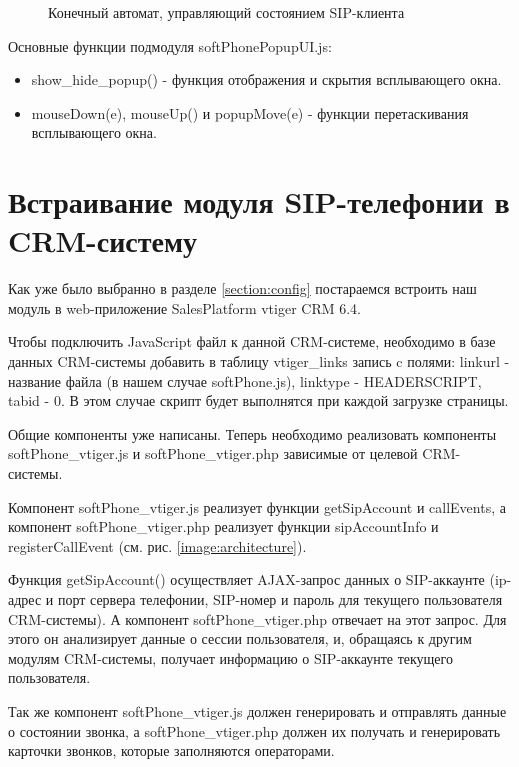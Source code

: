 \begin{figure}[h!]
\caption{Конечный автомат, управляющий состоянием SIP-клиента}
\label{image:FinalState}
\end{figure}

Основные функции подмодуля softPhonePopupUI.js:
\begin{itemize}
\item show\_hide\_popup() - функция отображения и скрытия всплывающего окна.
\item mouseDown(e), mouseUp() и popupMove(e) - функции перетаскивания всплывающего окна.
\end{itemize}

\section{Встраивание модуля SIP-телефонии в CRM-систему}

Как уже было выбранно в разделе \ref{section:config} постараемся встроить наш модуль в web-приложение SalesPlatform vtiger CRM 6.4.

Чтобы подключить JavaScript файл к данной CRM-системе, необходимо в базе данных CRM-системы добавить в таблицу vtiger\_links запись c полями: linkurl - название файла (в нашем случае softPhone.js), linktype - HEADERSCRIPT, tabid - 0.\cite{vtiger_db} В этом случае скрипт будет выполнятся при каждой загрузке страницы.

Общие компоненты уже написаны. Теперь необходимо реализовать компоненты softPhone\_vtiger.js и softPhone\_vtiger.php зависимые от целевой CRM-системы.

Компонент softPhone\_vtiger.js реализует функции getSipAccount и callEvents, а компонент softPhone\_vtiger.php реализует функции sipAccountInfo и registerCallEvent (см. рис. \ref{image:architecture}).

Функция getSipAccount() осуществляет AJAX-запрос данных о SIP-аккаунте (ip-адрес и порт сервера телефонии, SIP-номер и пароль для текущего пользователя CRM-системы). А компонент softPhone\_vtiger.php отвечает на этот запрос. Для этого он анализирует данные о сессии пользователя, и, обращаясь к другим модулям CRM-системы, получает информацию о SIP-аккаунте текущего пользователя.

Так же компонент softPhone\_vtiger.js должен генерировать и отправлять данные о состоянии звонка, а softPhone\_vtiger.php должен их получать и генерировать карточки звонков, которые заполняются операторами.

